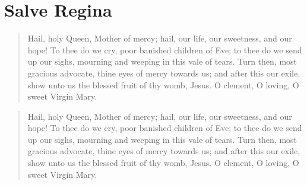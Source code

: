 {\bigskip{}
{
\newcommand{\vlatin}{Gáude et lætáre Virgo María, allelúia.}
\newcommand{\venglish}{Rejoice and be glad, O Virgin Mary, alleluia.}
\newcommand{\rlatin}{Quia surréxit Dóminus vere, allelúia.}
\newcommand{\renglish}{For the Lord is risen indeed, alleluia.}
\newcommand{\prayerlatin}{Deus, qui per resurrectiónem Fílii tui Dómini nostri Jesu Christi mundum lætificáre dignátus es~:~\gredagger{} præsta, quǽsumus; ut per ejus Genitrícem Vírginem Maríam~* perpétuæ capiámus gáudia vitæ. Per eúmdem Christum Dóminum nostrum. \Rbar~Amen.}
\newcommand{\prayerenglish}{O God, who didst vouchsafe to give joy to the world through the resurrection of Thy Son our Lord Jesus Christ; grant, we beseech Thee, that through His Mother, the Virgin Mary, we may obtain the joys of everlasing life. Through the same Christ our Lord. \Rbar~Amen.}

\afterant{}
}

%




\section{Salve Regina}
\printsimpletone{}
\printsolemntone{}

\begin{quote}{Hail, holy Queen, Mother of mercy; hail, our life, our sweetness, and our hope! To thee do we cry, poor banished children of Eve; to thee do we send up our sighs, mourning and weeping in this vale of tears.  Turn then, most gracious advocate, thine eyes of mercy towards us; and after this our exile, show unto us the blessed fruit of thy womb, Jesus.  O clement, O loving, O sweet Virgin Mary.}\end{quote}

%

\begin{quote}{Hail, holy Queen, Mother of mercy; hail, our life, our sweetness, and our hope! To thee do we cry, poor banished children of Eve; to thee do we send up our sighs, mourning and weeping in this vale of tears.  Turn then, most gracious advocate, thine eyes of mercy towards us; and after this our exile, show unto us the blessed fruit of thy womb, Jesus.  O clement, O loving, O sweet Virgin Mary.}\end{quote}

}
